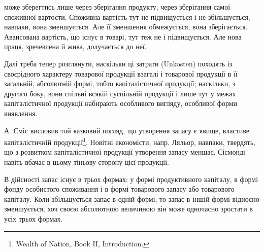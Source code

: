 \parcont{}  %
може зберегтись лише через зберігання продукту, через зберігання самої
споживної вартости. Споживна вартість тут не підвищується і не збільшується,
навпаки, вона зменшується. Але її зменшення обмежується,
вона зберігається. Авансована вартість, що існує в товарі, тут теж не
і підвищується. Але нова праця, зречевлена й жива, долучається до неї.

Далі треба тепер розглянути, наскільки ці затрати (Unkosten)
походять із своєрідного характеру товарової продукції взагалі і товарової
продукції в її загальній, абсолютній формі, тобто капіталістичної продукції;
наскільки, з другого боку, вони спільні всякій суспільній продукції і
лише тут у межах капіталістичної продукції набирають особливого вигляду,
особливої форми виявлення.

А. Сміс висловив той казковий погляд, що утворення запасу є явище,
властиве капіталістичній продукції\footnote{
Wealth of Nation, Book II, Introduction.
}. Новітні економісти, напр. Ляльор,
навпаки, твердять, що з розвитком капіталістичної продукції утворення запасу
меншає. Сісмонді навіть вбачає в цьому тіньову сторону цієї продукції.

В дійсності запас існує в трьох формах: у формі продуктивного
капіталу, в формі фонду особистого споживання і в формі товарового
запасу або товарового капіталу. Коли збільшується запас в одній формі,
то запас в іншій формі відносно зменшується, хоч своєю абсолютною
величиною він може одночасно зростати в усіх трьох формах.

